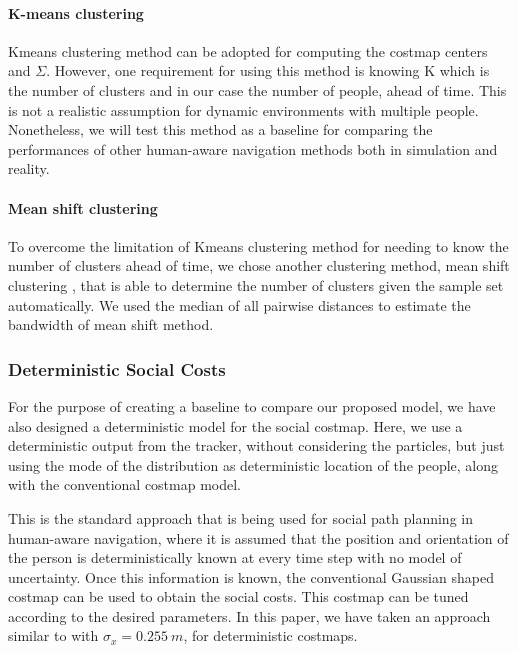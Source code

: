 \paragraph{K-means clustering}

Kmeans clustering \cite{hartigan1979algorithm} method can be adopted for computing the costmap centers and $\Sigma$. However, one requirement for using this method is knowing K which is the number of clusters and in our case the number of people, ahead of time. This is not a realistic assumption for dynamic environments with multiple people. Nonetheless, we will test this method as a baseline for comparing the performances of other human-aware navigation methods both in simulation and reality.

\paragraph{Mean shift clustering}
To overcome the limitation of Kmeans clustering method for needing to know the number of clusters ahead of time, we chose another clustering method, mean shift clustering \cite{comaniciu2002mean}, that is able to determine the number of clusters given the sample set automatically. We used the median of all pairwise distances to estimate the bandwidth of mean shift method.


\subsubsection{Deterministic Social Costs}
For the purpose of creating a baseline to compare our proposed model, we have also designed a deterministic model for the social costmap. 
Here, we use a deterministic output from the tracker, without considering the particles, but just using the mode of the distribution as deterministic location of the people, along with the conventional costmap model. 


This is the standard approach that is being used for social path planning in human-aware navigation, where it is assumed that the position and orientation of the person is deterministically known at every time step with no model of uncertainty. Once this information is known, the conventional Gaussian shaped costmap can be used to obtain the social costs. This costmap can be tuned according to the desired parameters. In this paper, we have taken an approach similar to \cite{gomez2013social} with ${\sigma}_{x} = 0.255\ m$, for deterministic costmaps. 



